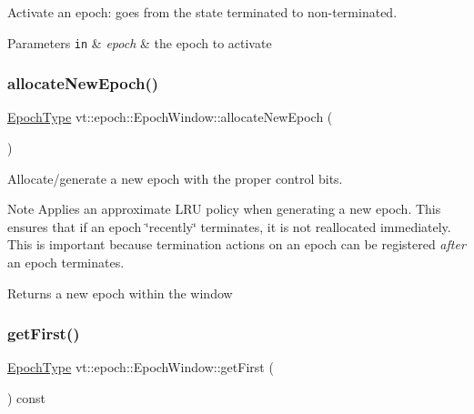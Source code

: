 Activate an epoch\+: goes from the state terminated to non-\/terminated. 


\begin{DoxyParams}[1]{Parameters}
\mbox{\tt in}  & {\em epoch} & the epoch to activate \\
\hline
\end{DoxyParams}
\mbox{\label{structvt_1_1epoch_1_1_epoch_window_a0c18249fdbc30c5e4ee0de6949a320a4}} 
\subsubsection{\texorpdfstring{allocate\+New\+Epoch()}{allocateNewEpoch()}}
{\footnotesize\ttfamily \hyperlink{structvt_1_1epoch_1_1_epoch_type}{Epoch\+Type} vt\+::epoch\+::\+Epoch\+Window\+::allocate\+New\+Epoch (\begin{DoxyParamCaption}{ }\end{DoxyParamCaption})}



Allocate/generate a new epoch with the proper control bits. 

\begin{DoxyNote}{Note}
Applies an approximate L\+RU policy when generating a new epoch. This ensures that if an epoch \char`\"{}recently\char`\"{} terminates, it is not reallocated immediately. This is important because termination actions on an epoch can be registered {\itshape after} an epoch terminates.
\end{DoxyNote}
\begin{DoxyReturn}{Returns}
a new epoch within the window 
\end{DoxyReturn}
\mbox{\label{structvt_1_1epoch_1_1_epoch_window_ae9bbc46060c62f7adeac93620d4ae0fc}} 
\subsubsection{\texorpdfstring{get\+First()}{getFirst()}}
{\footnotesize\ttfamily \hyperlink{structvt_1_1epoch_1_1_epoch_type}{Epoch\+Type} vt\+::epoch\+::\+Epoch\+Window\+::get\+First (\begin{DoxyParamCaption}{ }\end{DoxyParamCaption}) const\hspace{0.3cm}{\ttfamily [inline]}}



